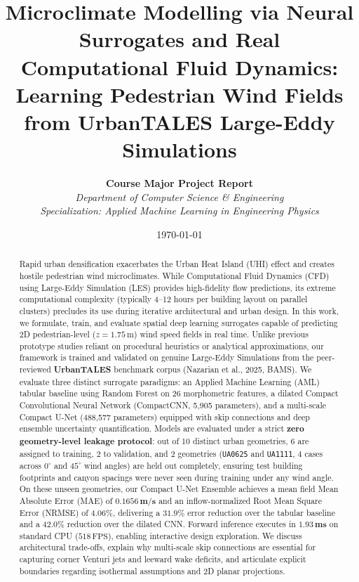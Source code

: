 \documentclass[10pt,twocolumn]{article}
\title{\textbf{\Large Microclimate Modelling via Neural Surrogates and Real Computational Fluid Dynamics: Learning Pedestrian Wind Fields from UrbanTALES Large-Eddy Simulations}}
\author{
    \textbf{Course Major Project Report} \\
    \textit{Department of Computer Science \& Engineering} \\
    \textit{Specialization: Applied Machine Learning in Engineering Physics}
}
\date{\today}
\begin{document}
\maketitle

\begin{abstract}
Rapid urban densification exacerbates the Urban Heat Island (UHI) effect and creates hostile pedestrian wind microclimates. While Computational Fluid Dynamics (CFD) using Large-Eddy Simulation (LES) provides high-fidelity flow predictions, its extreme computational complexity (typically 4--12 hours per building layout on parallel clusters) precludes its use during iterative architectural and urban design. In this work, we formulate, train, and evaluate spatial deep learning surrogates capable of predicting 2D pedestrian-level ($z=1.75\,\text{m}$) wind speed fields in real time. Unlike previous prototype studies reliant on procedural heuristics or analytical approximations, our framework is trained and validated on genuine Large-Eddy Simulations from the peer-reviewed \textbf{UrbanTALES} benchmark corpus (Nazarian et al., 2025, BAMS). We evaluate three distinct surrogate paradigms: an Applied Machine Learning (AML) tabular baseline using Random Forest on 26 morphometric features, a dilated Compact Convolutional Neural Network (CompactCNN, 5,905 parameters), and a multi-scale Compact U-Net (488,577 parameters) equipped with skip connections and deep ensemble uncertainty quantification. Models are evaluated under a strict \textbf{zero geometry-level leakage protocol}: out of 10 distinct urban geometries, 6 are assigned to training, 2 to validation, and 2 geometries (\texttt{UA0625} and \texttt{UA1111}, 4 cases across $0^\circ$ and $45^\circ$ wind angles) are held out completely, ensuring test building footprints and canyon spacings were never seen during training under any wind angle. On these unseen geometries, our Compact U-Net Ensemble achieves a mean field Mean Absolute Error (MAE) of $\mathbf{0.1656\,\text{m/s}}$ and an inflow-normalized Root Mean Square Error (NRMSE) of $\mathbf{4.06\%}$, delivering a $\mathbf{31.9\%}$ error reduction over the tabular baseline and a $\mathbf{42.0\%}$ reduction over the dilated CNN. Forward inference executes in $\mathbf{1.93\,\text{ms}}$ on standard CPU ($518\,\text{FPS}$), enabling interactive design exploration. We discuss architectural trade-offs, explain why multi-scale skip connections are essential for capturing corner Venturi jets and leeward wake deficits, and articulate explicit boundaries regarding isothermal assumptions and 2D planar projections.
\end{abstract}
\end{document}

